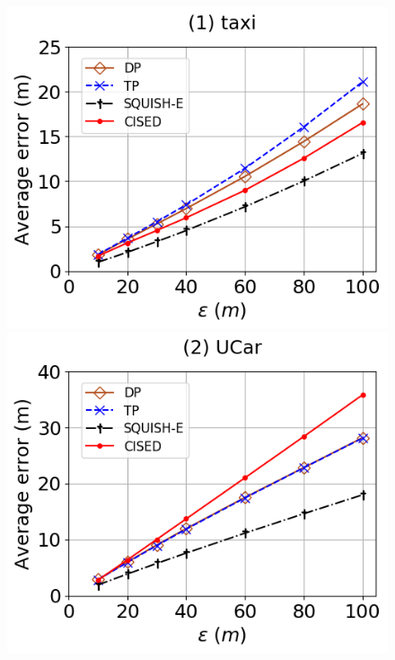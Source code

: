 \begin{figure}[tb!]
	\centering
	\includegraphics[scale=0.315]{Figures/Exp-SED-error-epsilon-taxi.png} \hspace{1ex}
	\includegraphics[scale=0.315]{Figures/Exp-SED-error-epsilon-service.png}	\hspace{1ex}

\end{figure}
